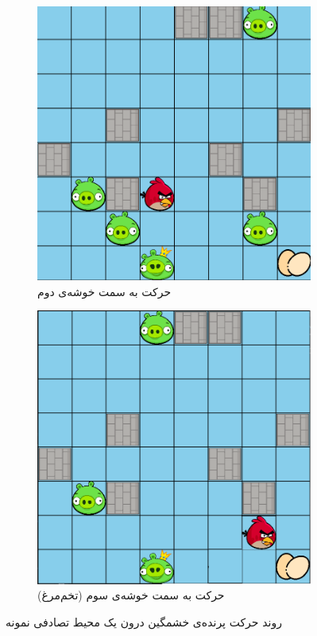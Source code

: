 \documentclass[11pt, a4paper, oneside]{report}
\begin{document}
\begin{figure}[H]
	\medskip
	\begin{subfigure}{0.40\textwidth}
		\includegraphics[width=\textwidth]{./images/mdp3}
		\caption{حرکت به سمت خوشه‌ی دوم}
		\label{fig:c}
	\end{subfigure}
	\hfill
	\begin{subfigure}{0.40\textwidth}
		\includegraphics[width=\textwidth]{./images/mdp4}
		\caption{حرکت به سمت  خوشه‌ی سوم (تخم‌مرغ)}
		\label{fig:d}
	\end{subfigure}
	
	\caption{روند حرکت پرنده‌ی خشمگین درون یک محیط تصادفی نمونه }
	\label{MDP}
	
\end{figure}
\end{document}
